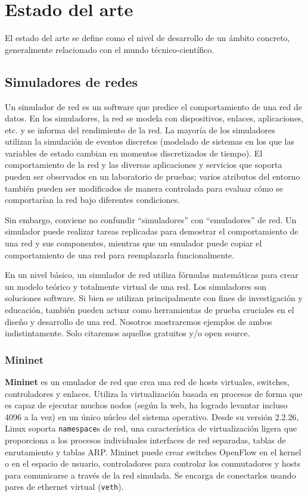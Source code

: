 \chapter{Estado del arte}\label{chap:ArtState}

El estado del arte se define como el nivel de desarrollo de un ámbito concreto, generalmente relacionado con el mundo técnico-científico.

\section{Simuladores de redes}
Un simulador de red es un software que predice el comportamiento de una red de datos. En los simuladores, la red se modela con dispositivos, enlaces, aplicaciones, etc. y se informa del rendimiento de la red. La mayoría de los simuladores utilizan la simulación de eventos discretos (modelado de sistemas en los que las variables de estado cambian en momentos discretizados de tiempo). El comportamiento de la red y las diversas aplicaciones y servicios que soporta pueden ser observados en un laboratorio de pruebas; varios atributos del entorno también pueden ser modificados de manera controlada para evaluar cómo se comportarían la red bajo diferentes condiciones\cite{wiki:Network_simulation}.

Sin embargo, conviene no confundir ``simuladores'' con ``emuladores'' de red. Un simulador puede realizar tareas replicadas para demostrar el comportamiento de una red y sus componentes, mientras que un emulador puede copiar el comportamiento de una red para reemplazarla funcionalmente\cite{emsim}.

En un nivel básico, un simulador de red utiliza fórmulas matemáticas para crear un modelo teórico y totalmente virtual de una red. Los simuladores son soluciones software. Si bien se utilizan principalmente con fines de investigación y educación, también pueden actuar como herramientas de prueba cruciales en el diseño y desarrollo de una red. Nosotros mostraremos ejemplos de ambos indistintamente. Solo citaremos aquellos gratuitos y/o open source.

\subsection{Mininet}
\textbf{Mininet} es un emulador de red que crea una red de hosts virtuales, switches, controladores y enlaces. Utiliza la virtualización basada en procesos de forma que es capaz de ejecutar muchos nodos (según la web, ha logrado levantar incluso 4096 a la vez) en un único núcleo del sistema operativo. Desde su versión 2.2.26, Linux soporta \texttt{namespace}s de red, una característica de virtualización ligera que proporciona a los procesos individuales interfaces de red separadas, tablas de enrutamiento y tablas ARP. Mininet puede crear switches OpenFlow en el kernel o en el espacio de usuario, controladores para controlar los conmutadores y hosts para comunicarse a través de la red simulada. Se encarga de conectarlos usando pares de ethernet virtual (\texttt{veth})\cite{mininet}.

